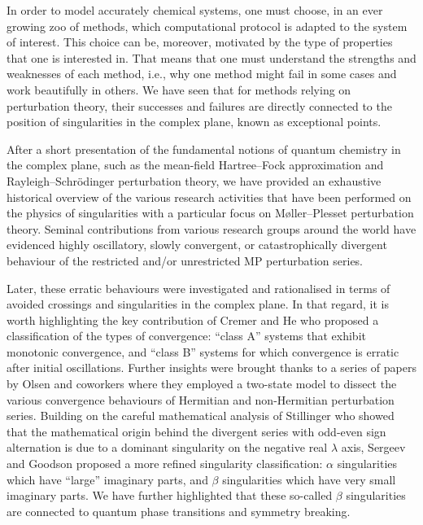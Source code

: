 \documentclass[aps,prb,reprint,noshowkeys,superscriptaddress]{revtex4-1}
\newcommand{\latin}[1]{#1}
\newcommand{\ie}{\latin{i.e.}}
\begin{document}
In order to model accurately chemical systems, one must choose, in an ever growing zoo of methods, which computational protocol is adapted to the system of interest.
This choice can be, moreover, motivated by the type of properties that one is interested in.
That means that one must understand the strengths and weaknesses of each method, \ie, why one method might fail in some cases and work beautifully in others. 
We have seen that for methods relying on perturbation theory, their successes and failures are directly connected to the position of singularities in the complex plane, known as exceptional points.

After a short presentation of the fundamental notions of quantum chemistry in the complex plane, such as the mean-field Hartree--Fock approximation and Rayleigh--Schr\"odinger perturbation theory, we have provided an exhaustive historical overview of the various research activities that have been performed on the physics of singularities with a particular focus on M{\o}ller--Plesset perturbation theory. 
Seminal contributions from various research groups around the world have evidenced highly oscillatory, slowly convergent, or catastrophically divergent behaviour of the restricted and/or unrestricted MP perturbation series.\cite{Laidig_1985,Knowles_1985,Handy_1985,Gill_1986,Laidig_1987,Nobes_1987,Gill_1988,Gill_1988a,Lepetit_1988} 

Later, these erratic behaviours were investigated and rationalised in terms of avoided crossings and singularities in the complex plane. 
In that regard, it is worth highlighting the key contribution of Cremer and He who proposed a classification of the types of convergence: \cite{Cremer_1996} ``class A'' systems that exhibit monotonic convergence, and ``class B'' systems for which convergence is erratic after initial oscillations. 
Further insights were brought thanks to a series of papers by Olsen and coworkers \cite{Christiansen_1996,Olsen_1996,Olsen_2000,Olsen_2019} where they employed a two-state model to dissect the various convergence behaviours of Hermitian and non-Hermitian perturbation series.
Building on the careful mathematical analysis of Stillinger who showed that the mathematical origin behind the divergent series with odd-even sign alternation is due to a dominant singularity on the negative real $\lambda$ axis, \cite{Stillinger_2000} Sergeev and Goodson proposed a more refined singularity classification: $\alpha$ singularities which have ``large'' imaginary parts, and $\beta$ singularities which have very small imaginary parts. \cite{Goodson_2000a,Goodson_2000b,Goodson_2004,Sergeev_2005,Sergeev_2006}
We have further highlighted that these so-called $\beta$ singularities are connected to quantum phase transitions and symmetry breaking.
\end{document}
